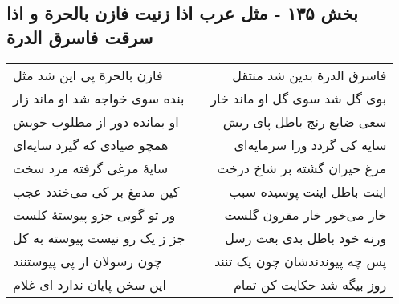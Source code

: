 \begin{center}
\section*{بخش ۱۳۵ - مثل عرب اذا زنیت فازن بالحرة و اذا سرقت فاسرق الدرة}
\label{sec:sh135}
\begin{longtable}{l p{0.5cm} r}
فازن بالحرة پی این شد مثل
&&
فاسرق الدرة بدین شد منتقل
\\
بنده سوی خواجه شد او ماند زار
&&
بوی گل شد سوی گل او ماند خار
\\
او بمانده دور از مطلوب خویش
&&
سعی ضایع رنج باطل پای ریش
\\
همچو صیادی که گیرد سایه‌ای
&&
سایه کی گردد ورا سرمایه‌ای
\\
سایهٔ مرغی گرفته مرد سخت
&&
مرغ حیران گشته بر شاخ درخت
\\
کین مدمغ بر کی می‌خندد عجب
&&
اینت باطل اینت پوسیده سبب
\\
ور تو گویی جزو پیوستهٔ کلست
&&
خار می‌خور خار مقرون گلست
\\
جز ز یک رو نیست پیوسته به کل
&&
ورنه خود باطل بدی بعث رسل
\\
چون رسولان از پی پیوستنند
&&
پس چه پیوندندشان چون یک تنند
\\
این سخن پایان ندارد ای غلام
&&
روز بیگه شد حکایت کن تمام
\\
\end{longtable}
\end{center}
